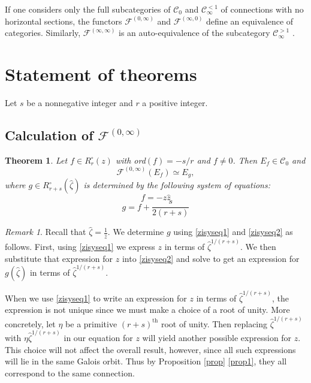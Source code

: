 \documentclass[11pt]{amsart}
\theoremstyle{plain}
\newtheorem{theorem}{Theorem}[section]
\theoremstyle{definition}
\theoremstyle{remark}
\newtheorem*{remark}{Remark}
\def\d{\displaystyle}
\def\z{\hat{\zeta}}
\def\C{\mathcal{C}}
\def\comp{\circ}
\begin{document}
If one considers only the full subcategories of $\mathcal{C}_0$ and $\mathcal{C}_{\infty}^{<1}$ of connections with no horizontal sections, the functors $\mathcal{F}^{(0,\infty)}$ and $\mathcal{F}^{(\infty,0)}$ define an equivalence of categories.  Similarly, $\mathcal{F}^{(\infty,\infty)}$ is an auto-equivalence of the subcategory $\mathcal{C}_{\infty}^{>1}$ \cite[Propositions 3.10 and 3.12]{bloch}.



\section{Statement of theorems}\label{state thms}

Let $s$ be a nonnegative integer and $r$ a positive integer.


\subsection{Calculation of $\mathcal{F}^{(0,\infty)}$}\label{subsec calc1}

\begin{theorem}\label{thm1} Let $f\in R^\comp_r(z)$ with ord$(f)=-s/r$ and $f\neq 0$.  Then $E_f\in \C_0$ and
\[\mathcal{F}^{(0,\infty)}(E_f)\simeq E_g,\]
where $g\in {R^\comp_{r+s}(\z)}$ is determined by the following system of equations:
\begin{equation}\label{zisyseq1}f=-z\hat{z}
\end{equation}
\begin{equation}\label{zisyseq2} g=f+\frac{s}{2(r+s)}
\end{equation}
\end{theorem}

\begin{remark} Recall that $\d{\z=\frac{1}{\hat{z}}}$.  We determine $g$ using \eqref{zisyseq1} and \eqref{zisyseq2} as follows.
First, using \eqref{zisyseq1} we express $z$ in terms of $\z^{1/(r+s)}$.  We then substitute that expression for $z$ into \eqref{zisyseq2} and solve to get an expression for $g(\z)$ in terms of $\z^{1/(r+s)}$.

When we use \eqref{zisyseq1} to write an expression for $z$ in terms of $\z^{1/(r+s)}$, the expression is not unique since we must make a choice of a root of unity.  More concretely, let $\eta$ be a primitive $(r+s)^{\text{th}}$ root of unity.  Then replacing $\z^{1/(r+s)}$ with $\eta\z^{1/(r+s)}$ in our equation for $z$ will yield another possible expression for $z$.  This choice will not affect the overall result, however, since all such expressions will lie in the same Galois orbit.  Thus by Proposition \ref{prop} \eqref{prop1}, they all correspond to the same connection.
\end{remark}
\end{document}
